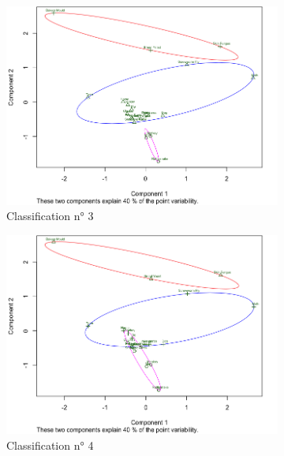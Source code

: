 \documentclass[a4paper,10pt]{report}
\begin{document}
\begin{figure}[H]
	\\
	\begin{subfigure}[b]{0.5\linewidth}
		\centering
		\captionsetup{justification=centering}
		\includegraphics[width=1\linewidth]{img/3-3-mut-K-means-class-3}
		\caption{\small Classification n° 3}
		\label{fig:3-3-mut-K-means-class-3}
	\end{subfigure}%
	\begin{subfigure}[b]{0.5\linewidth}
		\centering
		\captionsetup{justification=centering}
		\includegraphics[width=1\linewidth]{img/3-3-mut-K-means-class-4}
		\caption{\small Classification n° 4}
		\label{fig:3-3-mut-K-means-class-4}
	\end{subfigure}%
	\\
	\begin{subfigure}[b]{0.5\linewidth}

\end{subfigure}
\end{figure}
\end{document}
